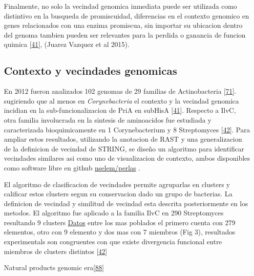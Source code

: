 \documentclass[12pt,twoside]{reedthesis}
\begin{document}
  Finalmente, no solo la vecindad genomica inmediata puede ser utilizada
  como distintivo en la busqueda de promiscuidad, diferencias en el
  contexto genomico en genes relacionados con una enzima promiscua, sin
  importar su ubicacion dentro del genoma tambien pueden ser relevantes
  para la perdida o ganancia de funcion quimica
  {[}\protect\hyperlink{ref-noda-garcia_evolution_2013}{41}{]}, (Juarez
  Vazquez et al 2015).
  
  \subsection{Contexto y vecindades
  genomicas}\label{contexto-y-vecindades-genomicas}
  
  En 2012 fueron analizados 102 genomas de 29 familias de Actinobacteria
  {[}\protect\hyperlink{ref-noda_tesis_2012}{71}{]}. sugiriendo que al
  menos en \emph{Corynebacteria} el contexto y la vecindad genomica
  incidian en la sub-funcionalizacion de PriA en subHisA
  {[}\protect\hyperlink{ref-noda-garcia_evolution_2013}{41}{]}. Respecto a
  IlvC, otra familia involucrada en la sintesis de aminoacidos fue
  estudiada y caracterizada bioquimicamente en 1 Corynebacterium y 8
  Streptomyces
  {[}\protect\hyperlink{ref-verdel-aranda_molecular_2015}{42}{]}. Para
  ampliar estos resultados, utilizando la anotacion de RAST y una
  generalizacion de la definicion de vecindad de STRING, se diseño un
  algoritmo para identificar vecindades similares asi como uno de
  visualizacion de contexto, ambos disponibles como software libre en
  github \href{https://github.com/nselem/perlas}{nselem/perlas} .
  
  El algoritmo de clasificacion de vecindades permite agruparlas en
  clusters y calificar estos clusters segun su conservacion dado un grupo
  de bacterias. La definicion de vecindad y similitud de vecindad esta
  descrita posteriormente en los metodos. El algoritmo fue aplicado a la
  familia IlvC en 290 Streptomyces resultando 9 clusters
  \href{http://148.247.230.43/nselem/CONTEXTS/REL_St275/ilvC/Contextos.php}{Datos}
  entre los mas poblados el primero cuenta con 279 elementos, otro con 9
  elemento y dos mas con 7 miembros (Fig 3), resultados experimentals son
  congruentes con que existe divergencia funcional entre miembros de
  clusters distintos
  {[}\protect\hyperlink{ref-verdel-aranda_molecular_2015}{42}{]}
  
  Natural products genomic
  era{[}\protect\hyperlink{ref-harvey_re-emergence_2015}{88}{]}
  
\end{document}
